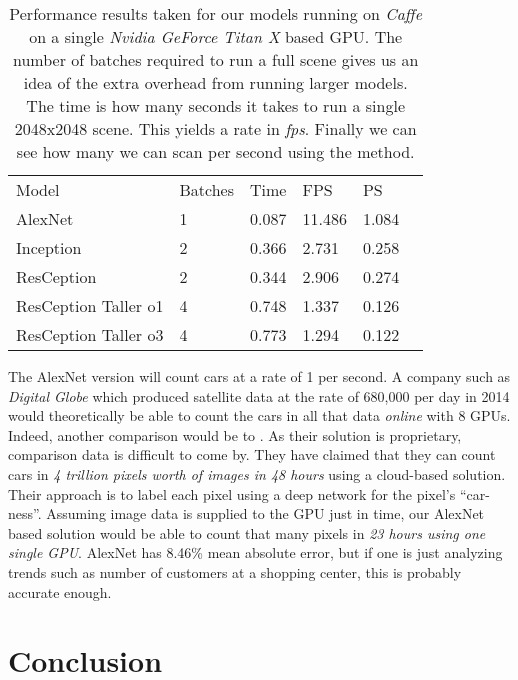 \documentclass[runningheads]{llncs}
\begin{document}
\setlength{\tabcolsep}{4pt}
\begin{table}
\begin{center}
\caption{Performance results taken for our models running on {\it Caffe} on a single {\it Nvidia GeForce Titan X} based GPU. The number of batches required to run a full scene gives us an idea of the extra overhead from running larger models. The time is how many seconds it takes to run a single 2048x2048 scene. This yields a rate in {\it fps}. Finally we can see how many  we can scan per second using the method. }
\label{table:count_time}
\begin{tabular}{llllll}
\hline\noalign{\smallskip}
Model & Batches & Time & FPS &  PS\\
\noalign{\smallskip}
\hline
\noalign{\smallskip}
AlexNet & 1 & 0.087 & 11.486 & 1.084\\
Inception & 2 & 0.366 & 2.731 & 0.258\\
ResCeption & 2 & 0.344 & 2.906 & 0.274\\
ResCeption Taller o1 & 4 & 0.748 & 1.337 & 0.126\\
ResCeption Taller o3 & 4 & 0.773 & 1.294 & 0.122\\
\hline
\end{tabular}
\end{center}
\end{table}
\setlength{\tabcolsep}{1.4pt}

The AlexNet version will count cars at a rate of 1  per second. A company such as {\it Digital Globe} which produced satellite data at the rate of 680,000  per day in 2014 would theoretically be able to count the cars in all that data {\it online} with 8 GPUs. Indeed, another comparison would be to \cite{OrbitalInsight16}. As their solution is proprietary, comparison data is difficult to come by. They have claimed that they can count cars in {\it 4 trillion pixels worth of images in 48 hours} using a cloud-based solution. Their approach is to label each pixel using a deep network \cite{Brust15} for the pixel's ``car-ness''. Assuming image data is supplied to the GPU just in time, our AlexNet based solution would be able to count that many pixels in {\it 23 hours using one single GPU}. AlexNet has 8.46\% mean absolute error, but if one is just analyzing trends such as number of customers at a shopping center, this is probably accurate enough.

\section{Conclusion}
\end{document}
